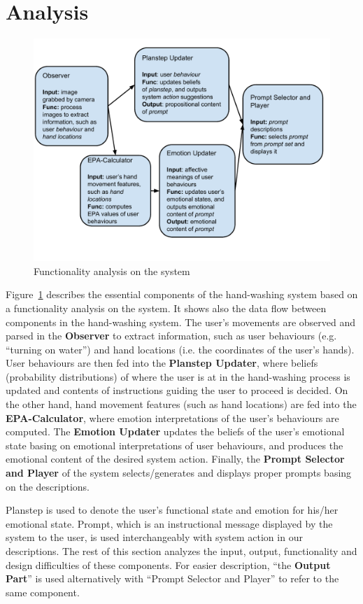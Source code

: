 \section{Analysis}
\label{sec:analysis}

\begin{figure}[h!]
\centering
\includegraphics[width=0.9\linewidth]{fig-components.pdf}
\caption{Functionality analysis on the system}
\label{fig:components}
\end{figure}

Figure~\ref{fig:components} describes the essential components of the hand-washing system based on a functionality analysis on the system. It shows also the data flow between components in the hand-washing system. The user's movements are observed and parsed in the \textbf{Observer} to extract information, such as user behaviours (e.g. ``turning on water'') and hand locations (i.e. the coordinates of the user's hands). User behaviours are then fed into the \textbf{Planstep Updater}, where beliefs (probability distributions) of where the user is at in the hand-washing process is updated and contents of instructions guiding the user to proceed is decided. On the other hand, hand movement features (such as hand locations) are fed into the \textbf{EPA-Calculator}, where emotion interpretations of the user's behaviours are computed. The \textbf{Emotion Updater} updates the beliefs of the user's emotional state basing on emotional interpretations of user behaviours, and produces the emotional content of the desired system action. Finally, the \textbf{Prompt Selector and Player} of the system selects/generates and displays proper prompts basing on the descriptions. 

Planstep is used to denote the user's functional state and emotion for his/her emotional state. Prompt, which is an instructional message displayed by the system to the user, is used interchangeably with system action in our descriptions. The rest of this section analyzes the input, output, functionality and design difficulties of these components. For easier description, ``the \textbf{Output Part}'' is used alternatively with ``Prompt Selector and Player'' to refer to the same component.

